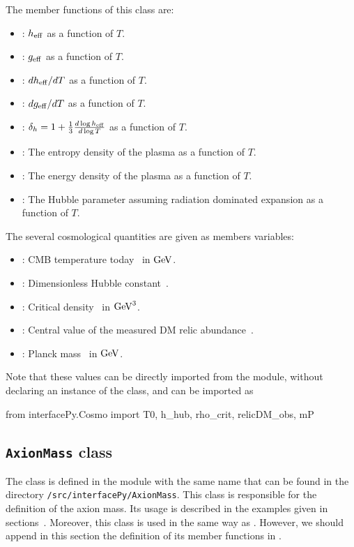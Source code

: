 \documentclass[11pt,a4paper]{article}
\begin{document}
The member functions of this class are:
%
\begin{itemize}
	\item {}: $h_{\rm eff}{}$ as a function of $T$.
	\item {}: $g_{\rm eff}{}$ as a function of $T$.
	\item {}: $dh_{\rm eff}{}/dT$ as a function of $T$.
	\item {}: $dg_{\rm eff}{}/dT$ as a function of $T$.
	\item {}: $\delta_h = 1 + \frac{1}{3} \frac{d\log h_{\rm eff}{}}{d\log T}$ as a function of $T$.
	\item {}: The entropy density of the plasma as a function of $T$.
	\item {}: The energy density of the plasma as a function of $T$.
	\item {}: The Hubble parameter assuming radiation dominated expansion as a function of $T$.
\end{itemize}

The several cosmological quantities are given as members variables:
%
\begin{itemize}
	\item {}: CMB temperature today~\cite{Zyla:2020zbs} in ${\rm GeV}$.
	\item {}: Dimensionless Hubble constant~\cite{Zyla:2020zbs}.
	\item {}: Critical density~\cite{Zyla:2020zbs} in ${\rm GeV}^3$.
	\item {}: Central value of the measured DM relic abundance~\cite{Planck:2018vyg}.
	\item {}: Planck mass~\cite{Zyla:2020zbs} in ${\rm GeV}$.
\end{itemize}

Note that these values can be directly imported from the module, without declaring an instance of the class, and can be imported as 
%
\begin{py}
	from interfacePy.Cosmo import T0, h_hub, rho_crit, relicDM_obs, mP
\end{py}

\subsection{{\tt AxionMass} class}
%
The  class is defined in the module with the same name that can be found in the directory {\tt \mimes/src/interfacePy/AxionMass}. This class is responsible for the definition of the axion mass.  Its usage is described in the examples given in sections~. Moreover, this class is used in the same way as . However, we should append in this section the definition of its member functions in \PY.
\end{document}
